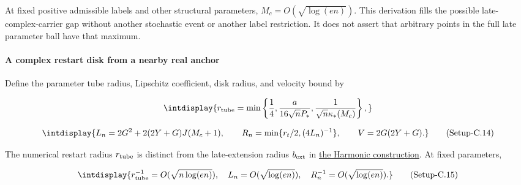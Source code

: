 
At fixed positive admissible labels and other structural parameters, \(M_c=O(\sqrt{\log(en)})\). This derivation fills the possible late-complex-carrier gap without another stochastic event or another label restriction. It does not assert that arbitrary points in the full late parameter ball have that maximum.


\paragraph{A complex restart disk from a nearby real anchor}
\label{int:setup-core-4}
\mbox{}\par\smallskip


Define the parameter tube radius, Lipschitz coefficient, disk radius, and velocity bound by


\begingroup\renewcommand{\theHequation}{intdisplay.936}
\begin{equation*}
\intdisplay{
r_{\rm tube}=\min\left\{\frac14,\frac{a}{16\sqrt nP_*},
                    \frac1{\sqrt n\kappa_*(M_c)}\right\},
}
\end{equation*}
\endgroup

\label{int:eq-setup-c-14}
\begingroup\renewcommand{\theHequation}{intdisplay.937}
\begin{equation}
\intdisplay{
L_n=2G^2+2(2Y+G)J(M_c+1),\qquad
R_n=\min\{r_t/2,(4L_n)^{-1}\},\qquad V=2G(2Y+G).
}
\tag{Setup-C.14}
\label{int:eq-0470-setup-c-14}
\end{equation}
\endgroup


The numerical restart radius \(r_{\rm tube}\) is distinct from the late-extension radius \(b_{\rm ext}\) in \hyperref[int:harmonic-construction]{the Harmonic construction}. At fixed parameters,


\label{int:eq-setup-c-15}
\begingroup\renewcommand{\theHequation}{intdisplay.938}
\begin{equation}
\intdisplay{
r_{\rm tube}^{-1}=O(\sqrt{n\log(en)}),\quad
L_n=O(\sqrt{\log(en)}),\quad
R_n^{-1}=O(\sqrt{\log(en)}).
}
\tag{Setup-C.15}
\label{int:eq-0471-setup-c-15}
\end{equation}
\endgroup

